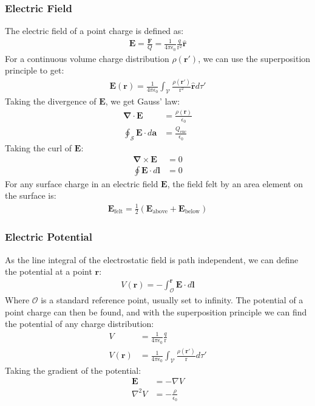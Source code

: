 \documentclass[11pt]{article}
\newcommand{\ve}[1]{
  \ensuremath{\bm{#1}}}	               %
\newcommand{\dr}{
  \ensuremath{\text{r}}}               %
\newcommand{\dvr}{
  \ensuremath{\textbf{r}}}             %
\newcommand{\dvrhat}{
  \ensuremath{\ve{\hat{\dvr}}}}	       %
\begin{document}
\begin{multicols*}{3}
\subsubsection{Electric Field}
The electric field of a point charge is defined as:
\begin{align*}
\ve{E}=\frac{\ve{F}}{Q}=\frac{1}{4\pi\epsilon_0}\frac{q}{\dr^2}\dvrhat
\end{align*}
For a continuous volume charge distribution $\rho(\ve{r'})$, we can use the superposition principle to get:
\begin{align*}
\ve{E}(\ve{r})=\frac{1}{4\pi\epsilon_0}\int_\mathcal{V}\frac{\rho(\ve{r'})}{\dr^2}\dvrhat d\tau'
\end{align*}
Taking the divergence of $\ve{E}$, we get Gauss' law:
\begin{align*}
\ve{\nabla}\cdot\ve{E}&=\frac{\rho{(\ve{r})}}{\epsilon_0}\\
\oint_\mathcal{S}\ve{E}\cdot d\ve{a}&=\frac{Q_\text{enc}}{\epsilon_0}
\end{align*}
Taking the curl of $\ve{E}$:
\begin{align*}
\ve{\nabla}\times\ve{E}&=0\\
\oint\ve{E}\cdot d\ve{l}&=0
\end{align*}
For any surface charge in an electric field $\ve{E}$, the field felt by an area element on the surface is:
\begin{align*}
\ve{E}_\text{felt}=\frac{1}{2}\left(\ve{E}_\text{above}+\ve{E}_\text{below}\right)
\end{align*}
\subsubsection{Electric Potential}
As the line integral of the electrostatic field is path independent, we can define the potential at a point $\ve{r}$:
\begin{align*}
V(\ve{r})=-\int_{\mathcal{O}}^{\ve{r}}\ve{E}\cdot d\ve{l}
\end{align*}
Where $\mathcal{O}$ is a standard reference point, usually set to infinity. The potential of a point charge can then be found, and with the superposition principle we can find the potential of any charge distribution:
\begin{align*}
V&=\frac{1}{4\pi\epsilon_0}\frac{q}{\dr}\\
V(\ve{r})&=\frac{1}{4\pi\epsilon_0}\int_\mathcal{V}\frac{\rho(\ve{r'})}{\dr} d\tau'
\end{align*}
Taking the gradient of the potential:
\begin{align*}
\ve{E}&=-\nabla V\\
\nabla^2V&=-\frac{\rho}{\epsilon_0}
\end{align*}


\end{multicols*}
\end{document}
